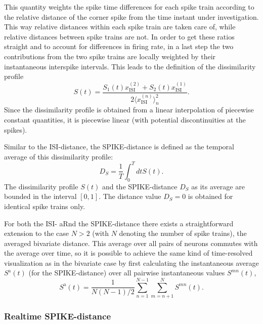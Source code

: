 \documentclass[10pt,twocolumn]{elsart5p}
\begin{document}
This quantity weights the spike time differences for each spike train according to the relative distance of the corner spike from the time instant under investigation. This way relative distances within each spike train are taken care of, while relative distances between spike trains are not. In order to get these ratios straight and to account for differences in firing rate, in a last step the two contributions from the two spike trains are locally weighted by their instantaneous interspike intervals. This leads to the definition of the dissimilarity profile
%
\begin{equation} \label{eq:Bi-Spike-Diss-Improved}
     S (t) = \frac{S_1 (t) x_{\mathrm {ISI}}^{(2)} + S_2 (t) x_{\mathrm {ISI}}^{(1)}}{2 \langle x_{\mathrm {ISI}}^{(n)} \rangle_n^2}.
\end{equation}
%
Since the dissimilarity profile is obtained from a linear interpolation of piecewise constant quantities, it is piecewise linear (with potential discontinuities at the spikes).

Similar to the ISI-distance, the SPIKE-distance is defined as the temporal average of this dissimilarity profile:
%
\begin{equation} \label{eq:Temporal-Average2}
    D_S = \frac{1}{T} \int_{0}^T dt S (t).
\end{equation}
%
The dissimilarity profile $S (t)$ and the SPIKE-distance $D_S$ as its average are bounded in the interval $[0, 1]$. The distance value $D_S = 0$ is obtained for identical spike trains only.

	
For both the ISI- aRnd the SPIKE-distance there exists a straightforward extension to the case $N > 2$ (with $N$ denoting the number of spike trains), the averaged bivariate distance. This average over all pairs of neurons commutes with the average over time, so it is possible to achieve the same kind of time-resolved visualization as in the bivariate case by first calculating the instantaneous average $S^{\mathrm {a}} (t)$ (for the SPIKE-distance) over all pairwise instantaneous values $S^{mn} (t)$,
%
\begin{equation} \label{eq:Bivariate-Average}
    S^{\mathrm {a}} (t) = \frac{1}{N(N-1)/2}\sum_{n=1}^{N-1} \sum_{m=n+1}^N S^{mn} (t).
\end{equation}



\subsubsection{\label{sss:Realtime-Spike-Distance} Realtime SPIKE-distance}
\end{document}
